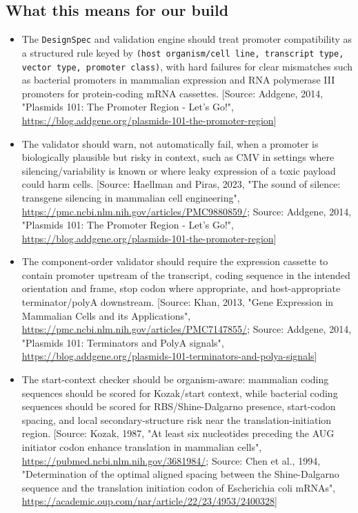 \documentclass[11pt]{report}
\begin{document}
\subsection{What this means for our build}
\begin{itemize}
\item The \texttt{DesignSpec} and validation engine should treat promoter compatibility as a structured rule keyed by \texttt{(host organism/cell line, transcript type, vector type, promoter class)}, with hard failures for clear mismatches such as bacterial promoters in mammalian expression and RNA polymerase III promoters for protein-coding mRNA cassettes. [Source: Addgene, 2014, "Plasmids 101: The Promoter Region - Let's Go!", \url{https://blog.addgene.org/plasmids-101-the-promoter-region}]
\item The validator should warn, not automatically fail, when a promoter is biologically plausible but risky in context, such as CMV in settings where silencing/variability is known or where leaky expression of a toxic payload could harm cells. [Source: Haellman and Piras, 2023, "The sound of silence: transgene silencing in mammalian cell engineering", \url{https://pmc.ncbi.nlm.nih.gov/articles/PMC9880859/}; Source: Addgene, 2014, "Plasmids 101: The Promoter Region - Let's Go!", \url{https://blog.addgene.org/plasmids-101-the-promoter-region}]
\item The component-order validator should require the expression cassette to contain promoter upstream of the transcript, coding sequence in the intended orientation and frame, stop codon where appropriate, and host-appropriate terminator/polyA downstream. [Source: Khan, 2013, "Gene Expression in Mammalian Cells and its Applications", \url{https://pmc.ncbi.nlm.nih.gov/articles/PMC7147855/}; Source: Addgene, 2014, "Plasmids 101: Terminators and PolyA signals", \url{https://blog.addgene.org/plasmids-101-terminators-and-polya-signals}]
\item The start-context checker should be organism-aware: mammalian coding sequences should be scored for Kozak/start context, while bacterial coding sequences should be scored for RBS/Shine-Dalgarno presence, start-codon spacing, and local secondary-structure risk near the translation-initiation region. [Source: Kozak, 1987, "At least six nucleotides preceding the AUG initiator codon enhance translation in mammalian cells", \url{https://pubmed.ncbi.nlm.nih.gov/3681984/}; Source: Chen et al., 1994, "Determination of the optimal aligned spacing between the Shine-Dalgarno sequence and the translation initiation codon of Escherichia coli mRNAs", \url{https://academic.oup.com/nar/article/22/23/4953/2400328}]

\end{itemize}
\end{document}
